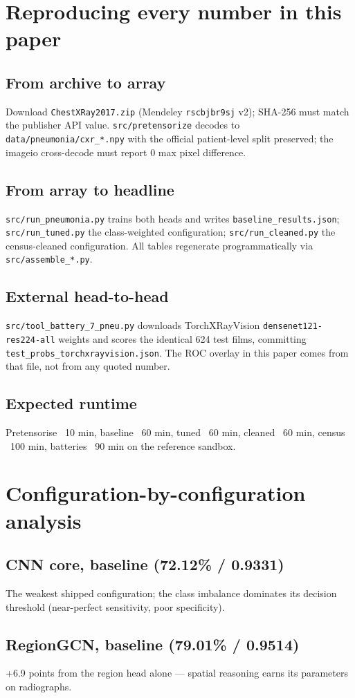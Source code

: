 
\section{Reproducing every number in this paper}
\subsection{From archive to array}
Download \texttt{ChestXRay2017.zip} (Mendeley \texttt{rscbjbr9sj} v2);
SHA-256 must match the publisher API value. \texttt{src/pretensorize}
decodes to \texttt{data/pneumonia/cxr\_*.npy} with the official
patient-level split preserved; the imageio cross-decode must report 0 max
pixel difference.
\subsection{From array to headline}
\texttt{src/run\_pneumonia.py} trains both heads and writes
\texttt{baseline\_results.json}; \texttt{src/run\_tuned.py} the
class-weighted configuration; \texttt{src/run\_cleaned.py} the
census-cleaned configuration. All tables regenerate programmatically via
\texttt{src/assemble\_*.py}.
\subsection{External head-to-head}
\texttt{src/tool\_battery\_7\_pneu.py} downloads TorchXRayVision
\texttt{densenet121-res224-all} weights and scores the identical 624 test
films, committing \texttt{test\_probs\_torchxrayvision.json}. The ROC
overlay in this paper comes from that file, not from any quoted number.
\subsection{Expected runtime}
Pretensorise ~10 min, baseline ~60 min, tuned ~60 min, cleaned ~60 min,
census ~100 min, batteries ~90 min on the reference sandbox.

\section{Configuration-by-configuration analysis}
\subsection{CNN core, baseline (72.12\% / 0.9331)}
The weakest shipped configuration; the class imbalance dominates its
decision threshold (near-perfect sensitivity, poor specificity).
\subsection{RegionGCN, baseline (79.01\% / 0.9514)}
+6.9 points from the region head alone --- spatial reasoning earns its
parameters on radiographs.
